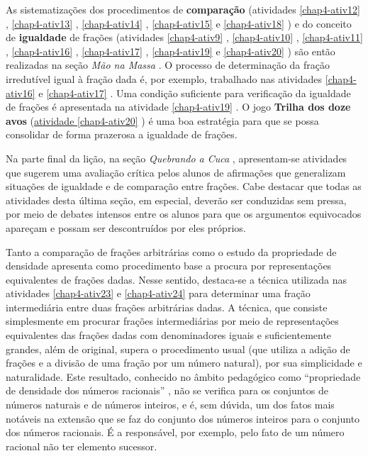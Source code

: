 \begin{multicols}{2}
  As sistematizações dos procedimentos de   {\bf comparação}   (atividades \ref{chap4-ativ12}  ,
\ref{chap4-ativ13} , \ref{chap4-ativ14}  , \ref{chap4-ativ15}   e \ref{chap4-ativ18}  ) e do conceito de   {\bf igualdade}   de frações
(atividades \ref{chap4-ativ9}  , \ref{chap4-ativ10}  , \ref{chap4-ativ11}  , \ref{chap4-ativ16}  , \ref{chap4-ativ17}  , \ref{chap4-ativ19}   e \ref{chap4-ativ20}  ) são então realizadas na
seção   {\it Mão na Massa}  . O processo de determinação da fração irredutível
igual à fração dada é, por exemplo, trabalhado nas atividades \ref{chap4-ativ16}   e \ref{chap4-ativ17}  . Uma
condição suficiente para verificação da igualdade de frações é apresentada na
atividade \ref{chap4-ativ19}  . O jogo   {\bf Trilha dos doze avos}   (\hyperref[chap4-ativ20]{atividade \ref{chap4-ativ20}}  ) é
uma boa estratégia para que se possa consolidar de forma prazerosa a igualdade
de frações.

  Na parte final da lição, na seção   {\it Quebrando a Cuca}  , apresentam-se
atividades que sugerem uma avaliação crítica pelos alunos de afirmações que
generalizam situações de igualdade e de comparação entre frações. Cabe destacar
que todas as atividades desta última seção, em especial, deverão ser conduzidas
sem pressa, por meio de debates intensos entre os alunos para que os argumentos
equivocados apareçam e possam ser descontruídos por eles próprios.

  Tanto a comparação de frações arbitrárias como o estudo da propriedade de
densidade apresenta como procedimento base a procura por representações
equivalentes de frações dadas. Nesse sentido, destaca-se a técnica utilizada nas
atividades \ref{chap4-ativ23}   e \ref{chap4-ativ24}   para determinar uma fração intermediária entre duas
frações arbitrárias dadas. A técnica, que consiste simplesmente em procurar
frações intermediárias por meio de representações equivalentes das frações dadas
com denominadores iguais e suficientemente grandes, além de original, supera o
procedimento usual (que utiliza a adição de frações e a divisão de uma fração
por um número natural), por sua simplicidade e naturalidade. Este resultado,
conhecido no âmbito pedagógico como   ``propriedade de densidade dos números
racionais''  , não se verifica para os conjuntos de números naturais e de
números inteiros, e é, sem dúvida, um dos fatos mais notáveis na extensão que se
faz do conjunto dos números inteiros para o conjunto dos números racionais.  É a
responsável, por exemplo, pelo fato de um número racional não ter elemento
sucessor.


\end{multicols}
